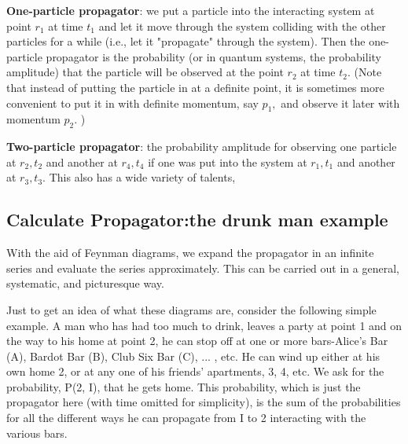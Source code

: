 \begin{imp}
\textbf{One-particle propagator}: we put a particle into the interacting system at point $r_{1}$ at time $t_{1}$ and let it move through the system colliding with the other particles for a while (i.e., let it "propagate" through the system). Then the one-particle propagator is the probability (or in quantum systems, the probability amplitude) that the particle will be observed at the point $r_{2}$ at time $t_{2} .$ (Note that instead of putting the particle in at a definite point, it is sometimes more convenient to put it in with definite momentum, say $p_{1},$ and observe it later with momentum $p_{2} .$ ) 
\end{imp}
\begin{imp}
\textbf{Two-particle propagator}: the probability amplitude for observing one particle at $r_{2}, t_{2}$ and another at $r_{4}, t_{4}$ if one was put into the system at $r_{1}, t_{1}$ and another at $r_{3}, t_{3}$. This also has a wide variety of talents, 
\end{imp}

\subsection{Calculate Propagator:the drunk man example}
With the aid of Feynman diagrams, we expand the propagator in an infinite series and evaluate the series approximately. This can be carried out in a general, systematic, and picturesque way.

Just to get an idea of what these diagrams are, consider the following simple example. A man who has had too much to drink, leaves a party at point 1 and on the way to his home at point 2, he can stop off at one or more bars-Alice's Bar (A), Bardot Bar (B), Club Six Bar (C), ... , etc. He can wind up either at his own home 2, or at any one of his friends' apartments, 3, 4, etc. We ask for the probability, P(2, I), that he gets home. This probability, which is just the propagator here (with time omitted for simplicity), is the sum of the probabilities for all the different ways he can propagate from I to 2 interacting with the various bars.

